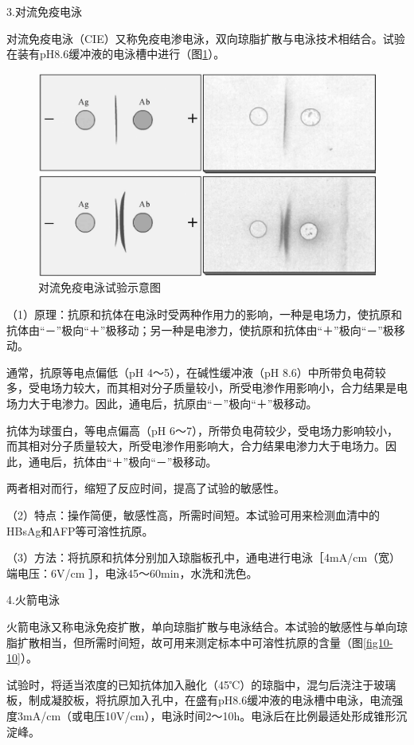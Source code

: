 3.对流免疫电泳

对流免疫电泳（CIE）又称免疫电渗电泳，双向琼脂扩散与电泳技术相结合。试验在装有pH8.6缓冲液的电泳槽中进行（图\ref{fig10-9}）。

\begin{figure}[!htbp]
 \centering
 \includegraphics{./images/Image00161.jpg}
 \captionsetup{justification=centering}
 \caption{对流免疫电泳试验示意图}
 \label{fig10-9}
  \end{figure} 

（1）原理：抗原和抗体在电泳时受两种作用力的影响，一种是电场力，使抗原和抗体由“－”极向“＋”极移动；另一种是电渗力，使抗原和抗体由“＋”极向“－”极移动。

通常，抗原等电点偏低（pH 4～5），在碱性缓冲液（pH
8.6）中所带负电荷较多，受电场力较大，而其相对分子质量较小，所受电渗作用影响小，合力结果是电场力大于电渗力。因此，通电后，抗原由“－”极向“＋”极移动。

抗体为球蛋白，等电点偏高（pH
6～7），所带负电荷较少，受电场力影响较小，而其相对分子质量较大，所受电渗作用影响大，合力结果电渗力大于电场力。因此，通电后，抗体由“＋”极向“－”极移动。

两者相对而行，缩短了反应时间，提高了试验的敏感性。

（2）特点：操作简便，敏感性高，所需时间短。本试验可用来检测血清中的HBsAg和AFP等可溶性抗原。

（3）方法：将抗原和抗体分别加入琼脂板孔中，通电进行电泳［4mA/cm（宽）端电压：6V/cm
］，电泳45～60min，水洗和洗色。

4.火箭电泳

火箭电泳又称电泳免疫扩散，单向琼脂扩散与电泳结合。本试验的敏感性与单向琼脂扩散相当，但所需时间短，故可用来测定标本中可溶性抗原的含量（图\ref{fig10-10}）。

试验时，将适当浓度的已知抗体加入融化（45℃）的琼脂中，混匀后浇注于玻璃板，制成凝胶板，将抗原加入孔中，在盛有pH8.6缓冲液的电泳槽中电泳，电流强度3mA/cm（或电压10V/cm），电泳时间2～10h。电泳后在比例最适处形成锥形沉淀峰。

